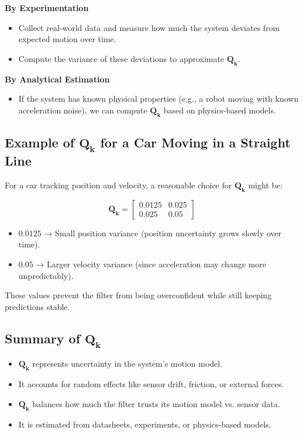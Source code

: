 \documentclass{article}
\begin{document}
\textbf{By Experimentation}
\begin{itemize}
    \item Collect real-world data and measure how much the system deviates from expected motion over time.
    \item Compute the variance of these deviations to approximate \(\mathbf{Q_k}\).
\end{itemize}

\textbf{By Analytical Estimation}
\begin{itemize}
    \item If the system has known physical properties (e.g., a robot moving with known acceleration noise), we can compute \(\mathbf{Q_k}\) based on physics-based models.
\end{itemize}

\subsection*{Example of \(\mathbf{Q_k}\) for a Car Moving in a Straight Line}
For a car tracking position and velocity, a reasonable choice for \(\mathbf{Q_k}\) might be:

\[
\mathbf{Q_k} =
\begin{bmatrix}
0.0125 & 0.025 \\
0.025 & 0.05
\end{bmatrix}
\]

\begin{itemize}
    \item \(0.0125\) → Small position variance (position uncertainty grows slowly over time).
    \item \(0.05\) → Larger velocity variance (since acceleration may change more unpredictably).
\end{itemize}

These values prevent the filter from being overconfident while still keeping predictions stable.

\subsection*{Summary of \(\mathbf{Q_k}\)}
\begin{itemize}
    \item \(\mathbf{Q_k}\) represents uncertainty in the system’s motion model.
    \item It accounts for random effects like sensor drift, friction, or external forces.
    \item \(\mathbf{Q_k}\) balances how much the filter trusts its motion model vs. sensor data.
    \item It is estimated from datasheets, experiments, or physics-based models.
\end{itemize}
\end{document}
